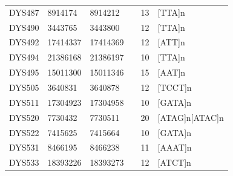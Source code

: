\begin{tabularx}{\linewidth}{l l l l l l }
DYS487      & 8914174  & 8914212  &                        & 13 & {[}TTA{]}n                                                                                                                           \\
DYS490      & 3443765  & 3443800  &                        & 12 & {[}TTA{]}n                                                                                                                           \\
DYS492      & 17414337 & 17414369 &                        & 12 & {[}ATT{]}n                                                                                                                           \\
DYS494      & 21386168 & 21386197 &                        & 10 & {[}TTA{]}n                                                                                                                           \\
DYS495      & 15011300 & 15011346 &                        & 15 & {[}AAT{]}n                                                                                                                           \\
DYS505      & 3640831  & 3640878  &                        & 12 & {[}TCCT{]}n                                                                                                                          \\
DYS511      & 17304923 & 17304958 &                        & 10 & {[}GATA{]}n                                                                                                                          \\
DYS520      & 7730432  & 7730511  &                        & 20 & {[}ATAG{]}n{[}ATAC{]}n                                                                                                               \\
DYS522      & 7415625  & 7415664  &                        & 10 & {[}GATA{]}n                                                                                                                          \\
DYS531      & 8466195  & 8466238  &                        & 11 & {[}AAAT{]}n                                                                                                                          \\
DYS533      & 18393226 & 18393273 &                        & 12 & {[}ATCT{]}n                                                                                                                          \\

\end{tabularx}
